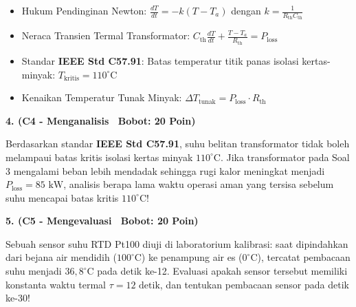\documentclass[10pt,a4paper]{article}
\begin{document}
\vfill

\begin{tcolorbox}[colback=unibblue!3,colframe=unibblue,colbacktitle=unibblue,coltitle=white,boxrule=0.6pt,arc=2pt,left=6pt,right=6pt,top=3pt,bottom=3pt,title=\textbf{\scriptsize FORMULA RUJUKAN TEKNIS \& STANDAR INDUSTRI TERKAIT}]
  \scriptsize
  \begin{itemize}[leftmargin=*, nosep]
  \item Hukum Pendinginan Newton: $\frac{dT}{dt} = -k (T - T_a)$ dengan $k = \frac{1}{R_{\text{th}} C_{\text{th}}}$
  \item Neraca Transien Termal Transformator: $C_{\text{th}} \frac{dT}{dt} + \frac{T - T_a}{R_{\text{th}}} = P_{\text{loss}}$
  \item Standar \textbf{IEEE Std C57.91}: Batas temperatur titik panas isolasi kertas-minyak: $T_{\text{kritis}} = 110^\circ\text{C}$
  \item Kenaikan Temperatur Tunak Minyak: $\Delta T_{\text{tunak}} = P_{\text{loss}} \cdot R_{\text{th}}$
\end{itemize}
\end{tcolorbox}

\newpage

\par
\vspace{1mm}

\noindent\textbf{4. (C4 - Menganalisis \textbar\ Bobot: 20 Poin)}\par\vspace{0.8mm}
{\footnotesize Berdasarkan standar \textbf{IEEE Std C57.91}, suhu belitan transformator tidak boleh melampaui batas kritis isolasi kertas minyak $110^\circ\text{C}$. Jika transformator pada Soal 3 mengalami beban lebih mendadak sehingga rugi kalor meningkat menjadi $P_{\text{loss}} = 85\text{ kW}$, analisis berapa lama waktu operasi aman yang tersisa sebelum suhu mencapai batas kritis $110^\circ\text{C}$!}\par

\vspace{3.5mm}

\noindent\textbf{5. (C5 - Mengevaluasi \textbar\ Bobot: 20 Poin)}\par\vspace{0.8mm}
{\footnotesize Sebuah sensor suhu RTD Pt100 diuji di laboratorium kalibrasi: saat dipindahkan dari bejana air mendidih ($100^\circ\text{C}$) ke penampung air es ($0^\circ\text{C}$), tercatat pembacaan suhu menjadi $36{,}8^\circ\text{C}$ pada detik ke-12. Evaluasi apakah sensor tersebut memiliki konstanta waktu termal $\tau = 12\text{ detik}$, dan tentukan pembacaan sensor pada detik ke-30!}\par
\end{document}
